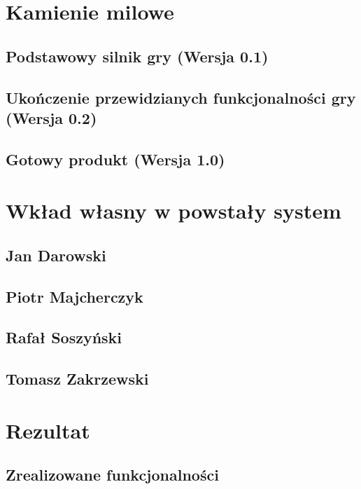 \documentclass[licencjacka]{pracamgr}
\begin{document}
\chapter{Kamienie milowe}

  \section{Podstawowy silnik gry (Wersja 0.1)}
  
  \section{Ukończenie przewidzianych funkcjonalności gry (Wersja 0.2)}
  
  \section{Gotowy produkt (Wersja 1.0)}

\chapter{Wkład własny w powstały system}

  \section{Jan Darowski}

  \section{Piotr Majcherczyk}

  \section{Rafał Soszyński}

  \section{Tomasz Zakrzewski}

\chapter{Rezultat}

  \section{Zrealizowane funkcjonalności}
\end{document}
